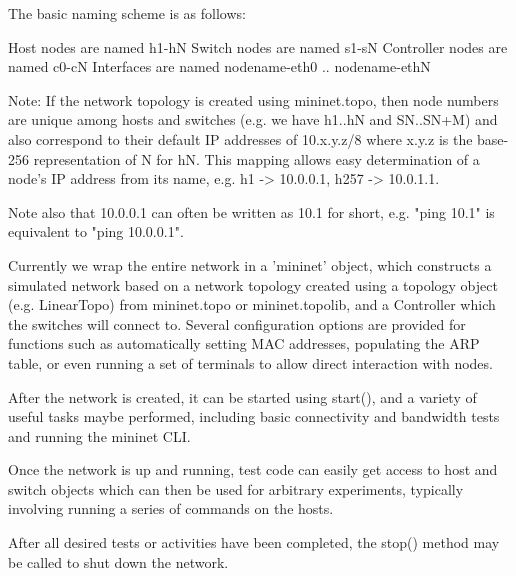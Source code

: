 \begin{DoxyVerb}
The basic naming scheme is as follows:

    Host nodes are named h1-hN
    Switch nodes are named s1-sN
    Controller nodes are named c0-cN
    Interfaces are named {nodename}-eth0 .. {nodename}-ethN

Note: If the network topology is created using mininet.topo, then
node numbers are unique among hosts and switches (e.g. we have
h1..hN and SN..SN+M) and also correspond to their default IP addresses
of 10.x.y.z/8 where x.y.z is the base-256 representation of N for
hN. This mapping allows easy determination of a node's IP
address from its name, e.g. h1 -> 10.0.0.1, h257 -> 10.0.1.1.

Note also that 10.0.0.1 can often be written as 10.1 for short, e.g.
"ping 10.1" is equivalent to "ping 10.0.0.1".

Currently we wrap the entire network in a 'mininet' object, which
constructs a simulated network based on a network topology created
using a topology object (e.g. LinearTopo) from mininet.topo or
mininet.topolib, and a Controller which the switches will connect
to. Several configuration options are provided for functions such as
automatically setting MAC addresses, populating the ARP table, or
even running a set of terminals to allow direct interaction with nodes.

After the network is created, it can be started using start(), and a
variety of useful tasks maybe performed, including basic connectivity
and bandwidth tests and running the mininet CLI.

Once the network is up and running, test code can easily get access
to host and switch objects which can then be used for arbitrary
experiments, typically involving running a series of commands on the
hosts.

After all desired tests or activities have been completed, the stop()
method may be called to shut down the network.\end{DoxyVerb}
 